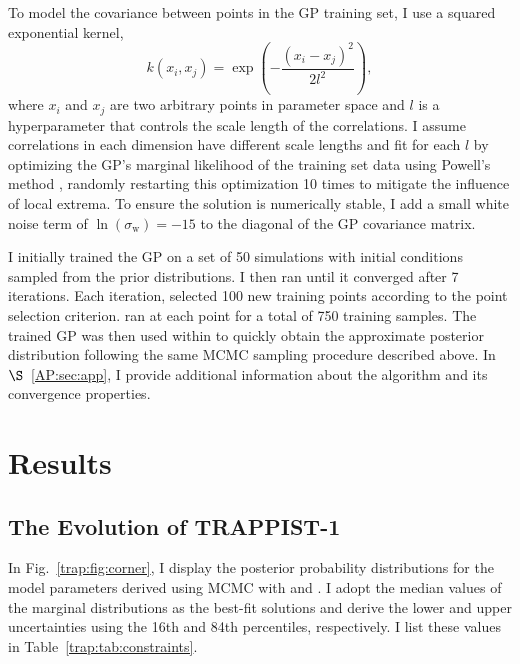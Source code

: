To model the covariance between points in the GP training set, I use a squared exponential kernel,
\begin{equation} \label{trap:eqn:kernel}
k(x_i, x_j) = \exp \left( - \frac{(x_i - x_j)^2}{2l^2} \right),
\end{equation}
where $x_i$ and $x_j$ are two arbitrary points in parameter space and $l$ is a hyperparameter that controls the scale length of the correlations. I assume correlations in each dimension have different scale lengths and fit for each $l$ by optimizing the GP's marginal likelihood of the training set data using Powell's method \citep{Powell1964}, randomly restarting this optimization 10 times to mitigate the influence of local extrema. To ensure the solution is numerically stable, I add a small white noise term of $\ln(\sigma_{\mathrm{w}}) = -15$ to the diagonal of the GP covariance matrix. 

I initially trained the GP on a set of 50 \vplanet simulations with initial conditions sampled from the prior distributions. I then ran \approxposterior until it converged after 7 iterations. Each iteration, \approxposterior selected 100 new training points according to the \citet{Kandasamy2017} point selection criterion. \approxposterior ran \vplanet at each point for a total of 750 training samples. The trained GP was then used within \emcee to quickly obtain the approximate posterior distribution following the same MCMC sampling procedure described above. In $\S$~\ref{AP:sec:app}, I provide additional information about the \approxposterior algorithm and its convergence properties.


\section{Results} \label{trap:sec:results}

\subsection{The Evolution of TRAPPIST-1}

In Fig.~\ref{trap:fig:corner}, I display the posterior probability distributions for the model parameters derived using MCMC with \vplanet and \emcee. I adopt the median values of the marginal distributions as the best-fit solutions and derive the lower and upper uncertainties using the 16th and 84th percentiles, respectively. I list these values in Table~\ref{trap:tab:constraints}.

